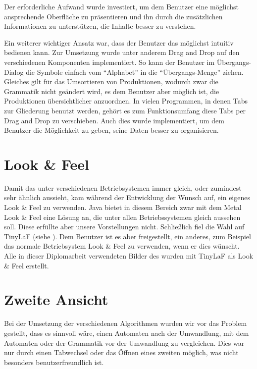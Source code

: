 \newpage
Der erforderliche Aufwand wurde investiert, um dem Benutzer eine möglichst
ansprechende Oberfläche zu präsentieren und ihn durch die zusätzlichen
Informationen zu unterstützen, die Inhalte besser zu verstehen.\vspace{10pt}

Ein weiterer wichtiger Ansatz war, dass der Benutzer das \gtitool möglichst
intuitiv bedienen kann. Zur Umsetzung wurde unter anderem Drag and Drop auf den
verschiedenen Komponenten implementiert. So kann der Benutzer im Übergangs-Dialog
die Symbole einfach vom "`Alphabet"' in die "`Übergangs-Menge"' ziehen. Gleiches
gilt für das Umsortieren von Produktionen, wodurch zwar die Grammatik nicht
geändert wird, es dem Benutzer aber möglich ist, die Produktionen übersichtlicher
anzuordnen. In vielen Programmen, in denen Tabs zur Gliederung benutzt werden,
gehört es zum Funktionsumfang diese Tabs per Drag and Drop zu verschieben. Auch
dies wurde implementiert, um dem Benutzer die Möglichkeit zu geben, seine Daten besser zu
organisieren.\vspace{10pt}


\section{Look \& Feel}\label{LookAndFeel}

Damit das \gtitool unter verschiedenen Betriebsystemen immer gleich, oder
zumindest sehr ähnlich aussieht, kam während der Entwicklung der Wunsch auf, ein
eigenes Look \& Feel zu verwenden. Java bietet in diesem Bereich zwar mit dem
Metal Look \& Feel eine Lösung an, die unter allen Betriebssystemen gleich
aussehen soll. Diese erfüllte aber unsere Vorstellungen nicht. Schließlich fiel
die Wahl auf TinyLaF (siehe \cite{tinylaf}). Dem Benutzer ist es aber
freigestellt, ein anderes, zum Beispiel das normale Betriebsystem Look \& Feel zu
verwenden, wenn er dies wünscht. Alle in dieser Diplomarbeit verwendeten Bilder
des \gtitools wurden mit TinyLaF als Look \& Feel erstellt.\vspace{10pt}


\section{Zweite Ansicht}\label{SecondView}

Bei der Umsetzung der verschiedenen Algorithmen wurden wir vor das Problem
gestellt, dass es sinnvoll wäre, einen Automaten nach der Umwandlung, mit dem
Automaten oder der Grammatik vor der Umwandlung zu vergleichen. Dies war nur
durch einen Tabwechsel oder das Öffnen eines zweiten \gtitools möglich, was
nicht besonders benutzerfreundlich ist.\vspace{10pt}


